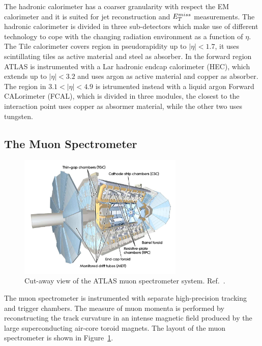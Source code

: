 The hadronic calorimeter has a coarser granularity with respect the EM calorimeter and it is suited  for
jet reconstruction and $E_{T}^{miss}$ measurements. The hadronic calorimeter is divided in three sub-detectors which make use of different technology to cope 
with the changing radiation environment as a function of $\eta$. The Tile calorimeter covers region in pseudorapidity up to $|\eta| < 1.7$, it uses 
scintillating tiles as active material and steel as absorber. 
In the forward region ATLAS is instrumented with a Lar hadronic endcap calorimeter (HEC),
which extends up to $|\eta| < 3.2$ and uses argon as active material and copper as absorber. The region in $3.1 <|\eta| < 4.9$ is istrumented instead with a 
liquid argon Forward CALorimeter (FCAL), 
which is divided in three modules, the closest to the interaction point uses 
copper as absormer material, while the other two uses tungsten.



\subsection{The Muon Spectrometer}
\begin{figure}[tp]
     \begin{center}

            \includegraphics[width=0.7\textwidth]{figure/muonSpec.png}

    \end{center}
    \caption{Cut-away view of the ATLAS muon spectrometer system. Ref.~\cite{ATLASDetector}.}



   \label{fig:atlasMu}
\end{figure}
The muon spectrometer is instrumented with separate high-precision tracking and trigger chambers. The measure of muon momenta is performed 
by reconstructing the track curvature in an intense magnetic field produced by the large superconducting air-core toroid magnets.
The layout of the muon spectrometer is shown in Figure~\ref{fig:atlasMu}.

